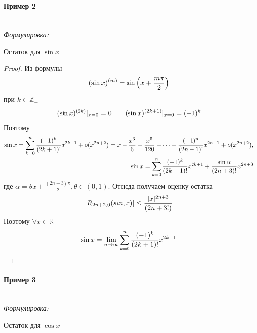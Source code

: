 \documentclass{article}
\let\vanillaparagraph\paragraph
\renewcommand{\paragraph}[1]{\vanillaparagraph{#1}\mbox{}\\}
\begin{document}
\paragraph{Пример 2}

\textit{Формулировка: }

Остаток для $\sin{x}$

\begin{proof}
Из формулы 
\begin{equation}
(\sin{x})^{(m)} = \sin{\left(x + \frac{m\pi} {2}\right)}\notag
\end{equation}
при $k \in \mathbb{Z}_+$
\begin{equation}
(\sin{x})^{(2k)} \arrowvert_{x=0} = 0 \qquad (\sin{x})^{(2k + 1)} \arrowvert_{x=0} = (-1)^k\notag
\end{equation}
Поэтому 
\begin{eqnarray}
\sin{x} = \sum_{k=0}^n \frac{(-1)^k} {(2k+1)!} x^{2k+1} + o(x^{2n+2}) = x - \frac{x^3} {6} + \frac{x^5} {120} - \dots + \frac{(-1)^n} {(2n + 1)!} x^{2n+1} + o(x^{2n+2}),\notag \\
\sin{x} = \sum_{k=0}^n \frac{(-1)^k} {(2k+1)!} x^{2k+1} + \frac {\sin{\alpha}} {(2n+3)!} x^{2n+3}\notag
\end{eqnarray}
где $\alpha = \theta x + \frac{(2n + 3)\pi} {2}, \theta \in (0, 1)$.
Отсюда получаем оценку остатка
\begin{equation}
|R_{2n+2, 0} (sin, x )| \leq \frac{|x|^{2n + 3}} {(2n+3!)} \notag
\end{equation}
Поэтому $\forall x \in \mathbb{R}$
\begin{equation}
\sin{x} = \lim_{n\to\infty}\sum_{k=0}^n \frac{(-1)^k} {(2k+1)!} x^{2k+1}\notag
\end{equation}
\end{proof}

\paragraph{Пример 3}

\textit{Формулировка: }

Остаток для $\cos{x}$
\end{document}
